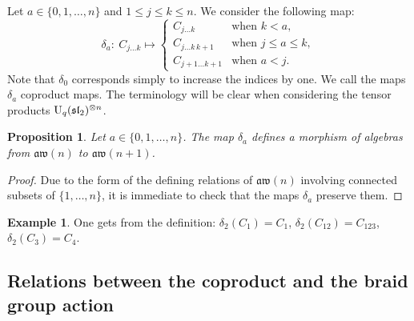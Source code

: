 \documentclass[10pt,a4paper]{amsart}
\numberwithin{equation}{section}
\newtheorem{prop}[theo]{Proposition}
\theoremstyle{definition}
\newtheorem{exam}[theo]{Example}
\newcommand{\aw}{\mathfrak{aw}(n)}
\begin{document}
Let $a\in\{0,1,\dots,n\}$ and $1\leq j\leq k\leq n$. We consider the following map:
\begin{equation}\label{eq:delta}
\delta_a\colon \
C_{j\dots k} \mapsto
\begin{cases}
C_{j\dots k}&\mbox{when } k<a ,\\
 C_{j\dots k\,k+1}&\mbox{when } j\leq a\leq k ,\\
 C_{j+1\dots k+1}&\mbox{when } a<j .
 \end{cases}
\end{equation}
Note that $\delta_0$ corresponds simply to increase the indices by one. We call the maps $\delta_a$ coproduct maps. The terminology will be clear when considering the tensor products ${\rm U}_q(\mathfrak{sl}_2)^{\otimes n}$.
\begin{prop}
 Let $a\in\{0,1,\dots,n\}$. The map $\delta_a$ defines a morphism of algebras from $\aw$ to $\mathfrak{aw}(n+1)$.
\end{prop}
\begin{proof}
Due to the form of the defining relations of $\aw$ involving connected subsets of $\{1,\dots,n\}$, it is immediate to check that the maps $\delta_a$ preserve them.
\end{proof}

\begin{exam}
One gets from the definition: $\delta_2(C_1)=C_1$, $\delta_2(C_{12})=C_{123}$, $\delta_2(C_{3})=C_{4}$.
\end{exam}

\subsection{Relations between the coproduct and the braid group action}
\end{document}
